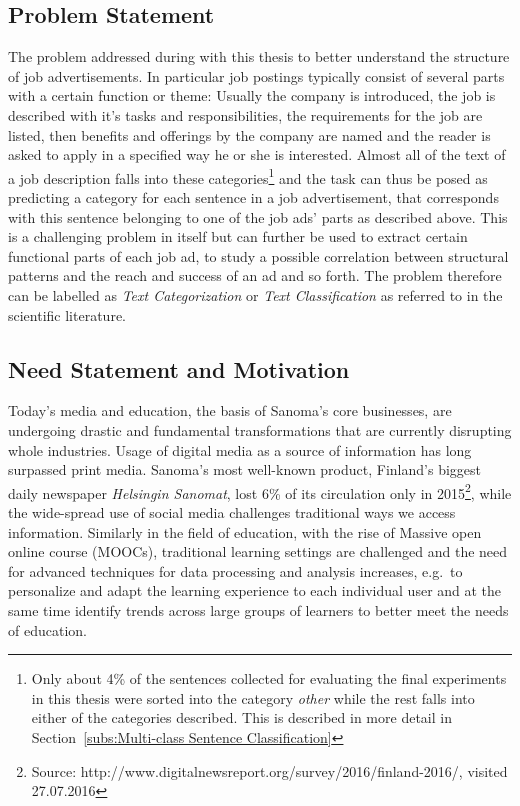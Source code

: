 \subsection{Problem Statement}

The problem addressed during with this thesis to better understand the structure of job advertisements. In particular job postings typically consist of several parts with a certain function or theme: Usually the company is introduced, the job is described with it's tasks and responsibilities, the requirements for the job are listed, then benefits and offerings by the company are named and the reader is asked to apply in a specified way he or she is interested.
Almost all of the text of a job description falls into these categories\footnote{Only about 4\% of the sentences collected for evaluating the final experiments in this thesis were sorted into the category \emph{other} while the rest falls into either of the categories described. This is described in more detail in Section~\ref{subs:Multi-class Sentence Classification}} and the task can thus be posed as predicting a category for each sentence in a job advertisement, that corresponds with this sentence belonging to one of the job ads' parts as described above.
This is a challenging problem in itself but can further be used to extract certain functional parts of each job ad, to study a possible correlation between structural patterns and the reach and success of an ad and so forth. The problem therefore can be labelled as \emph{Text Categorization} or \emph{Text Classification} as referred to in the scientific literature.


\subsection{Need Statement and Motivation}


Today's media and education, the basis of Sanoma's core businesses, are undergoing drastic and fundamental transformations that are currently disrupting whole industries. Usage of digital media as a source of information has long surpassed print media. Sanoma's most well-known product, Finland's biggest daily newspaper \emph{Helsingin Sanomat}, lost 6\% of its circulation only in 2015\footnote{Source: http://www.digitalnewsreport.org/survey/2016/finland-2016/, visited 27.07.2016}, while the wide-spread use of social media challenges traditional ways we access information. Similarly in the field of education, with the rise of Massive open online course (MOOCs), traditional learning settings are challenged and the need for advanced techniques for data processing and analysis increases, e.g.\ to personalize and adapt the learning experience to each individual user and at the same time identify trends across large groups of learners to better meet the needs of education.

